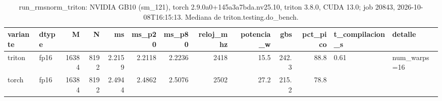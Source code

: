 \begin{table}[htbp]
  \centering\small
  \begin{tabular}{llrrrrrrrrrll}
    \toprule
    variante & dtype & M & N & ms & ms\_p20 & ms\_p80 & reloj\_mhz & potencia\_w & gbs & pct\_pico & t\_compilacion\_s & detalle \\
    \midrule
    triton & fp16 & 16384 & 8192 & 2.2159 & 2.2118 & 2.2236 & 2418 & 15.5 & 242.3 & 88.8 & 0.61 & num\_warps=16 \\
    torch & fp16 & 16384 & 8192 & 2.4944 & 2.4862 & 2.5076 & 2502 & 27.2 & 215.2 & 78.8 &  &  \\
    \bottomrule
  \end{tabular}
  \caption{run\_rmsnorm\_triton: NVIDIA GB10 (sm\_121), torch 2.9.0a0+145a3a7bda.nv25.10, triton 3.8.0, CUDA 13.0; job 20843, 2026-10-08T16:15:13. Mediana de triton.testing.do\_bench.}
  \label{tab:hennessy-frio-run-rmsnorm-triton}
\end{table}
